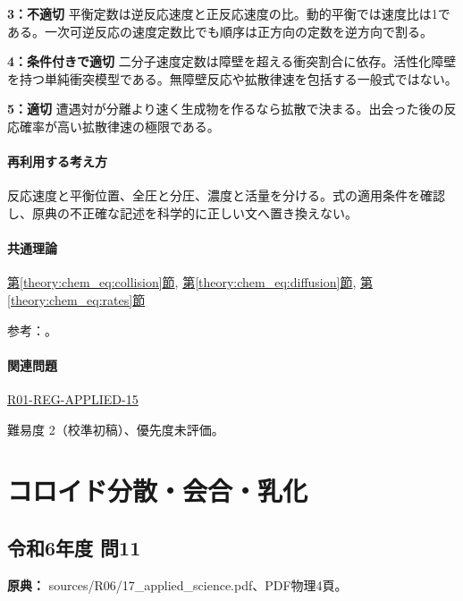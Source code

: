 \noindent\textbf{3：不適切} 平衡定数は逆反応速度と正反応速度の比。動的平衡では速度比は1である。一次可逆反応の速度定数比でも順序は正方向の定数を逆方向で割る。\par

\noindent\textbf{4：条件付きで適切} 二分子速度定数は障壁を超える衝突割合に依存。活性化障壁を持つ単純衝突模型である。無障壁反応や拡散律速を包括する一般式ではない。\par

\noindent\textbf{5：適切} 遭遇対が分離より速く生成物を作るなら拡散で決まる。出会った後の反応確率が高い拡散律速の極限である。\par

\paragraph{再利用する考え方} 反応速度と平衡位置、全圧と分圧、濃度と活量を分ける。式の適用条件を確認し、原典の不正確な記述を科学的に正しい文へ置き換えない。

\paragraph{共通理論} \hyperref[theory:chem_eq:collision]{第\ref*{theory:chem_eq:collision}節}, \hyperref[theory:chem_eq:diffusion]{第\ref*{theory:chem_eq:diffusion}節}, \hyperref[theory:chem_eq:rates]{第\ref*{theory:chem_eq:rates}節}

\par 参考：\cite{iupac_greenbook2012}。

\paragraph{関連問題} \hyperref[q:r01-reg-applied-15]{R01-REG-APPLIED-15}

\par 難易度 2（校準初稿）、優先度未評価。

\section{コロイド分散・会合・乳化}

\subsection{令和6年度 問11}
\label{q:r06-reg-applied-11}

\noindent\textbf{原典：} sources/R06/17\_applied\_science.pdf、PDF物理4頁。

